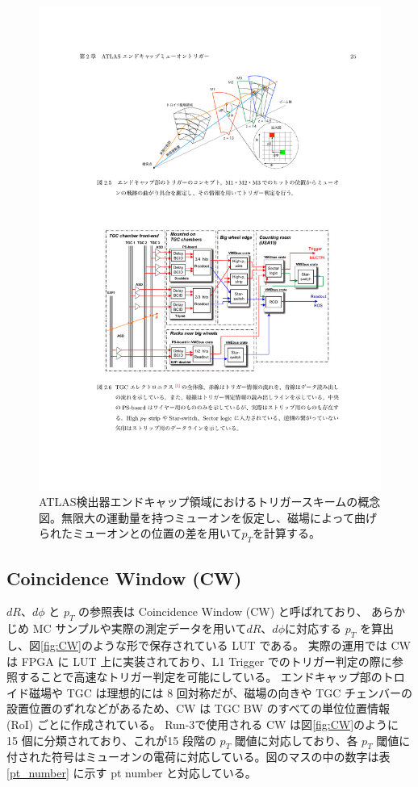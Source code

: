 \begin{figure}[tb]
  \centering
  \includegraphics[clip, width=15cm]{fig/3/akatsuka_mt_trigger_scheme.pdf}
  \caption{ATLAS検出器エンドキャップ領域におけるトリガースキームの概念図\cite{article:akatsuka-mron}。無限大の運動量を持つミューオンを仮定し、磁場によって曲げられたミューオンとの位置の差を用いて$p_T$を計算する。}
  \label{fig:trigger-scheme}
\end{figure}

\subsection{Coincidence Window (CW)}\label{section:CW}
$dR$、$d\phi$ と $p_T$ の参照表は Coincidence Window (CW) と呼ばれており、
あらかじめ MC サンプルや実際の測定データを用いて$dR$、$d\phi$に対応する $p_T$ を算出し、図\ref{fig:CW}のような形で保存されている LUT である。
実際の運用では CW は FPGA に LUT 上に実装されており、L1 Trigger でのトリガー判定の際に参照することで高速なトリガー判定を可能にしている。
エンドキャップ部のトロイド磁場や TGC は理想的には 8 回対称だが、磁場の向きや TGC チェンバーの設置位置のずれなどがあるため、CW は TGC BW のすべての単位位置情報 (RoI) ごとに作成されている。
Run-3で使用される CW は図\ref{fig:CW}のように 15 個に分類されており、これが15 段階の $p_T$ 閾値に対応しており、各 $p_T$ 閾値に付された符号はミューオンの電荷に対応している。図のマスの中の数字は表\ref{pt_number} に示す pt number と対応している。



